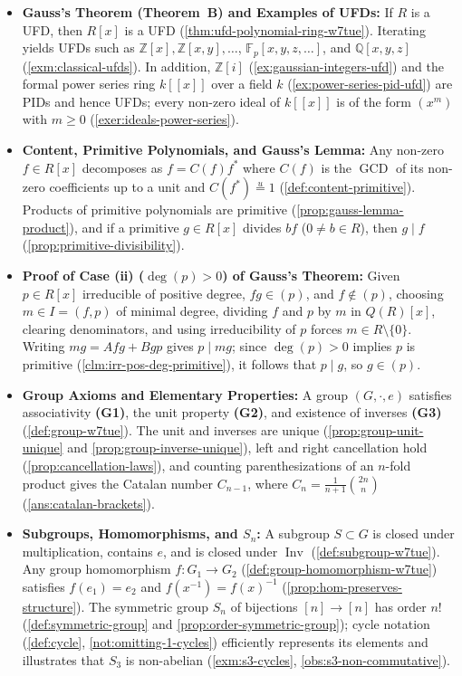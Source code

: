 \begin{overview}
\begin{itemize}
    \item \textbf{Gauss's Theorem (Theorem~B) and Examples of UFDs:} If $R$ is a UFD, then $R[x]$ is a UFD (\cref{thm:ufd-polynomial-ring-w7tue}). Iterating yields UFDs such as $\mathbb{Z}[x], \mathbb{Z}[x, y], \dots$, $\mathbb{F}_p[x, y, z, \dots]$, and $\mathbb{Q}[x, y, z]$ (\cref{exm:classical-ufds}). In addition, $\mathbb{Z}[i]$ (\cref{ex:gaussian-integers-ufd}) and the formal power series ring $k[[x]]$ over a field $k$ (\cref{ex:power-series-pid-ufd}) are PIDs and hence UFDs; every non-zero ideal of $k[[x]]$ is of the form $(x^m)$ with $m \ge 0$ (\cref{exer:ideals-power-series}).
    \item \textbf{Content, Primitive Polynomials, and Gauss's Lemma:} Any non-zero $f \in R[x]$ decomposes as $f = C(f) f^*$ where $C(f)$ is the $\operatorname{GCD}$ of its non-zero coefficients up to a unit and $C(f^*) \stackrel{u}{=} 1$ (\cref{def:content-primitive}). Products of primitive polynomials are primitive (\cref{prop:gauss-lemma-product}), and if a primitive $g \in R[x]$ divides $bf$ ($0 \neq b \in R$), then $g \mid f$ (\cref{prop:primitive-divisibility}).
    \item \textbf{Proof of Case (ii) ($\deg(p) > 0$) of Gauss's Theorem:} Given $p \in R[x]$ irreducible of positive degree, $fg \in (p)$, and $f \notin (p)$, choosing $m \in I = (f, p)$ of minimal degree, dividing $f$ and $p$ by $m$ in $Q(R)[x]$, clearing denominators, and using irreducibility of $p$ forces $m \in R \setminus \{0\}$. Writing $mg = Afg + Bgp$ gives $p \mid mg$; since $\deg(p) > 0$ implies $p$ is primitive (\cref{clm:irr-pos-deg-primitive}), it follows that $p \mid g$, so $g \in (p)$.
    \item \textbf{Group Axioms and Elementary Properties:} A group $(G, \cdot, e)$ satisfies associativity \textbf{(G1)}, the unit property \textbf{(G2)}, and existence of inverses \textbf{(G3)} (\cref{def:group-w7tue}). The unit and inverses are unique (\cref{prop:group-unit-unique} and \cref{prop:group-inverse-unique}), left and right cancellation hold (\cref{prop:cancellation-laws}), and counting parenthesizations of an $n$-fold product gives the Catalan number $C_{n-1}$, where $C_n = \frac{1}{n+1}\binom{2n}{n}$ (\cref{ans:catalan-brackets}).
    \item \textbf{Subgroups, Homomorphisms, and $S_n$:} A subgroup $S \subset G$ is closed under multiplication, contains $e$, and is closed under $\operatorname{Inv}$ (\cref{def:subgroup-w7tue}). Any group homomorphism $f \colon G_1 \to G_2$ (\cref{def:group-homomorphism-w7tue}) satisfies $f(e_1) = e_2$ and $f(x^{-1}) = f(x)^{-1}$ (\cref{prop:hom-preserves-structure}). The symmetric group $S_n$ of bijections $[n] \to [n]$ has order $n!$ (\cref{def:symmetric-group} and \cref{prop:order-symmetric-group}); cycle notation (\cref{def:cycle}, \cref{not:omitting-1-cycles}) efficiently represents its elements and illustrates that $S_3$ is non-abelian (\cref{exm:s3-cycles}, \cref{obs:s3-non-commutative}).

\end{itemize}
\end{overview}

